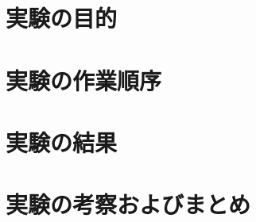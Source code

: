 \documentclass[a4paper,11pt,xelatex,ja=standard]{bxjsarticle}
\begin{document}
\section{実験の目的}
\section{実験の作業順序}
\section{実験の結果}
\section{実験の考察およびまとめ}
\end{document}
